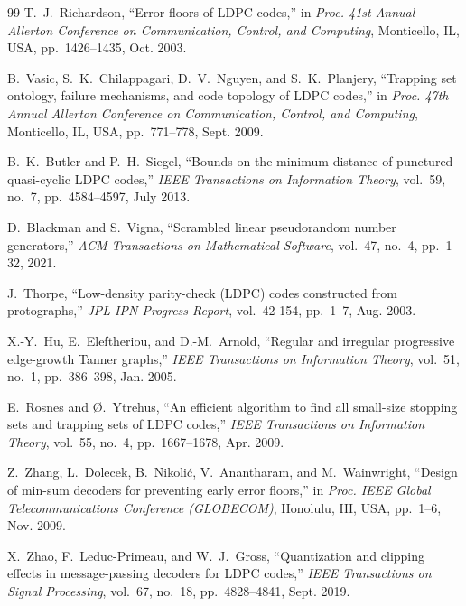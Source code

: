 \documentclass[10pt]{article}
\begin{document}
\begin{thebibliography}{99}
T.~J.~Richardson, ``Error floors of LDPC codes,'' in \emph{Proc. 41st Annual Allerton Conference on Communication, Control, and Computing}, Monticello, IL, USA, pp.~1426--1435, Oct. 2003.

B.~Vasic, S.~K.~Chilappagari, D.~V.~Nguyen, and S.~K.~Planjery, ``Trapping set ontology, failure mechanisms, and code topology of LDPC codes,'' in \emph{Proc. 47th Annual Allerton Conference on Communication, Control, and Computing}, Monticello, IL, USA, pp.~771--778, Sept. 2009.

B.~K.~Butler and P.~H.~Siegel, ``Bounds on the minimum distance of punctured quasi-cyclic LDPC codes,'' \emph{IEEE Transactions on Information Theory}, vol.~59, no.~7, pp.~4584--4597, July 2013.

D.~Blackman and S.~Vigna, ``Scrambled linear pseudorandom number generators,'' \emph{ACM Transactions on Mathematical Software}, vol.~47, no.~4, pp.~1--32, 2021.

J.~Thorpe, ``Low-density parity-check (LDPC) codes constructed from protographs,'' \emph{JPL IPN Progress Report}, vol.~42-154, pp.~1--7, Aug. 2003.

X.-Y.~Hu, E.~Eleftheriou, and D.-M.~Arnold, ``Regular and irregular progressive edge-growth Tanner graphs,'' \emph{IEEE Transactions on Information Theory}, vol.~51, no.~1, pp.~386--398, Jan. 2005.

E.~Rosnes and {\O}.~Ytrehus, ``An efficient algorithm to find all small-size stopping sets and trapping sets of LDPC codes,'' \emph{IEEE Transactions on Information Theory}, vol.~55, no.~4, pp.~1667--1678, Apr. 2009.

Z.~Zhang, L.~Dolecek, B.~Nikoli{\'c}, V.~Anantharam, and M.~Wainwright, ``Design of min-sum decoders for preventing early error floors,'' in \emph{Proc. IEEE Global Telecommunications Conference (GLOBECOM)}, Honolulu, HI, USA, pp.~1--6, Nov. 2009.

X.~Zhao, F.~Leduc-Primeau, and W.~J.~Gross, ``Quantization and clipping effects in message-passing decoders for LDPC codes,'' \emph{IEEE Transactions on Signal Processing}, vol.~67, no.~18, pp.~4828--4841, Sept. 2019.

\end{thebibliography}
\end{document}
